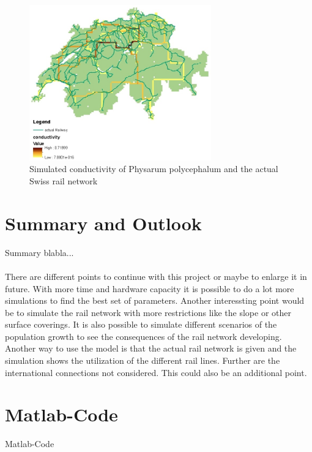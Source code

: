 \documentclass[11pt]{scrartcl}
\begin{document}
\begin{figure}[H]
	\centering
	\includegraphics[width=0.7\textwidth]{figures/conductivity_railway}
	\caption{Simulated conductivity of Physarum polycephalum and the actual Swiss rail network}
	\label{fig:conductivity}
\end{figure}


\section{Summary and Outlook}
\label{sec:summary}

Summary blabla...\\
\\
There are different points to continue with this project or maybe to enlarge it in future. With more time and hardware capacity it is possible to do a lot more simulations to find the best set of parameters. Another interessting point would be to simulate the rail network with more restrictions like the slope or other surface coverings. It is also possible to simulate different scenarios of the population growth to see the consequences of the rail network developing. Another way to use the model is that the actual rail network is given and the simulation shows the utilization of the different rail lines.
Further are the international connections not considered. This could also be an additional point.



\appendix
\section{Matlab-Code}
Matlab-Code
\end{document}
